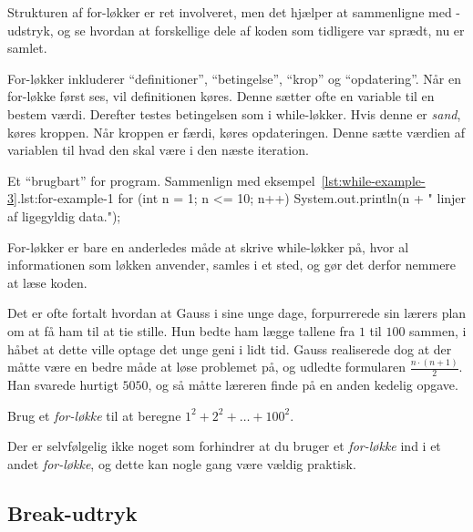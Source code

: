
		Strukturen af for-løkker er ret involveret, men det hjælper at
		sammenligne med -udstryk, og se hvordan at forskellige
		dele af koden som tidligere var sprædt, nu er samlet.

        For-løkker inkluderer ``definitioner'', ``betingelse'',
        ``krop'' og ``opdatering''. Når en for-løkke først ses, vil
        definitionen køres. Denne sætter ofte en variable til en
        bestem værdi. Derefter testes betingelsen som i while-løkker.
        Hvis denne er \emph{sand}, køres kroppen. Når kroppen er
        færdi, køres opdateringen. Denne sætte værdien af variablen
        til hvad den skal være i den næste iteration.

		\begin{JavaCode}{Et ``brugbart'' for program. Sammenlign med eksempel~\ref{lst:while-example-3}.}{lst:for-example-1}
			for (int n = 1; n <= 10; n++) {
				System.out.println(n + " linjer af ligegyldig data.");
			}
		\end{JavaCode}

        For-løkker er bare en anderledes måde at skrive while-løkker
        på, hvor al informationen som løkken anvender, samles i et
        sted, og gør det derfor nemmere at læse koden.

		\begin{exercise}
			Det er ofte fortalt hvordan at Gauss i sine unge dage, forpurrerede sin
			lærers plan om at få ham til at tie stille. Hun bedte ham lægge tallene
			fra \(1\) til \(100\) sammen, i håbet at dette ville optage det unge
			geni i lidt tid. Gauss realiserede dog at der måtte være en bedre måde
			at løse problemet på, og udledte formularen \(\frac{n\cdot(n+1)}{2}\).
			Han svarede hurtigt \(5050\), og så måtte læreren finde på en anden
			kedelig opgave.

			Brug et \emph{for-løkke} til at beregne \(1^2+2^2+\dots+100^2\).
		\end{exercise}

		\begin{exercise}
			Der er selvfølgelig ikke noget som forhindrer at du bruger et
			\emph{for-løkke} ind i et andet \emph{for-løkke}, og dette kan nogle gang
			være vældig praktisk.

		\end{exercise}

	\subsection{Break-udtryk}

